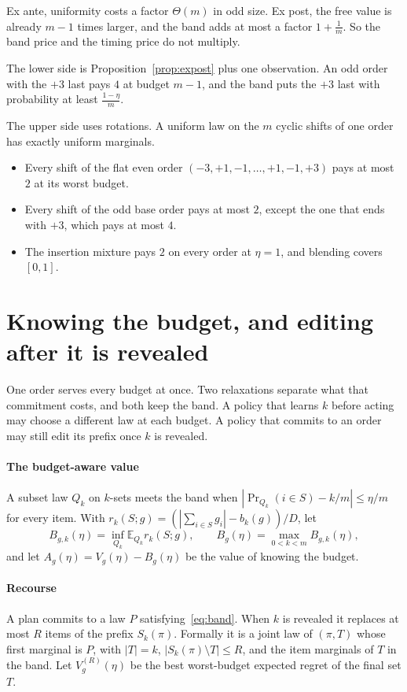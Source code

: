 
Ex ante, uniformity costs a factor $\Theta(m)$ in odd size. Ex post, the free value is
already $m-1$ times larger, and the band adds at most a factor $1+\frac1m$. So the band price
and the timing price do not multiply.

The lower side is Proposition~\ref{prop:expost} plus one observation. An odd order with the
$+3$ last pays $4$ at budget $m-1$, and the band puts the $+3$ last with probability at least
$\frac{1-\eta}{m}$.

The upper side uses rotations. A uniform law on the $m$ cyclic shifts of one order has exactly
uniform marginals.
\begin{itemize}
\item Every shift of the flat even order $(-3,+1,-1,\dots,+1,-1,+3)$ pays at most $2$ at its
worst budget.
\item Every shift of the odd base order pays at most $2$, except the one that ends with $+3$,
which pays at most $4$.
\item The insertion mixture pays $2$ on every order at $\eta=1$, and blending covers $[0,1]$.
\end{itemize}

\section{Knowing the budget, and editing after it is revealed}
\label{sec:aware}

One order serves every budget at once. Two relaxations separate what that commitment costs,
and both keep the band. A policy that learns $k$ before acting may choose a different law at
each budget. A policy that commits to an order may still edit its prefix once $k$ is revealed.

\paragraph{The budget-aware value} A subset law $Q_{k}$ on $k$-sets meets the band when
$|\Pr_{Q_{k}}(i\in S)-k/m|\le\eta/m$ for every item. With
$r_{k}(S;g)=(|\sum_{i\in S}g_{i}|-b_{k}(g))/D$, let
\[
B_{g,k}(\eta)=\inf_{Q_{k}}\mathbb{E}_{Q_{k}}r_{k}(S;g),\qquad
B_{g}(\eta)=\max_{0<k<m}B_{g,k}(\eta),
\]
and let $A_{g}(\eta)=V_{g}(\eta)-B_{g}(\eta)$ be the value of knowing the budget.

\paragraph{Recourse} A plan commits to a law $P$ satisfying~\eqref{eq:band}. When $k$ is
revealed it replaces at most $R$ items of the prefix $S_{k}(\pi)$. Formally it is a joint law
of $(\pi,T)$ whose first marginal is $P$, with $|T|=k$, $|S_{k}(\pi)\setminus T|\le R$, and the
item marginals of $T$ in the band. Let $V^{(R)}_{g}(\eta)$ be the best worst-budget expected
regret of the final set $T$.

